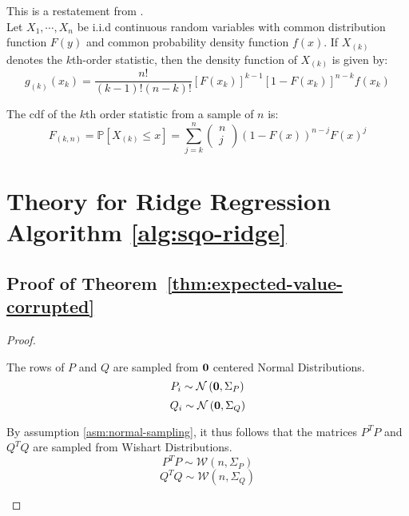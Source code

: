 \documentclass{article} %
\begin{document}
\begin{appendices}
	\begin{fact}
		This is a restatement from \cite{Wackerly2008}.\\
		Let $X_1,\cdots, X_n$ be i.i.d continuous random variables with common distribution function $F(y)$ and common probability density function $f(x)$. If $X_{(k)}$ denotes the $k$th-order statistic, then the density function of $X_{(k)}$ is given by:
		\begin{equation}
			g_{(k)}(x_k) = \frac{n!}{(k-1)!(n-k)!}[F(x_k)]^{k-1}[1 - F(x_k)]^{n-k}f(x_k)
		\end{equation}
	\end{fact}

	\begin{fact}
		The cdf of the $k$th order statistic from a sample of $n$ is:
		\begin{equation}
			F_{(k,n)} = \mathbb{P}\left[X_{(k)}\leq x \right] = \sum_{j=k}^n \begin{pmatrix} n \\ j\end{pmatrix} \left(1 - F(x)\right)^{n-j} F(x)^j
		\end{equation}
	\end{fact}

	\newpage
	
	\section{Theory for Ridge Regression Algorithm \ref{alg:sqo-ridge}}\label{app:Subquantile-optimization}
	\subsection{Proof of Theorem~\ref{thm:expected-value-corrupted}}\label{app:expected-value-corrupted}
	\begin{proof}
	\begin{assumption}\label{asm:normal-sampling}
		The rows of $P$ and $Q$ are sampled from ${\bm{0}}$ centered Normal Distributions.
		\begin{equation*}
			P_i \sim \mathcal{N}\left({\bm{0}}, \Sigma_P\right)
		\end{equation*}
		\begin{equation}
			Q_i \sim \mathcal{N}\left({\bm{0}}, \Sigma_Q\right)
		\end{equation}
	\end{assumption}
	
	\begin{assumption}\label{asm:wishart}
		By assumption \ref{asm:normal-sampling}, it thus follows that the matrices $P^T P$ and $Q^T Q$ are sampled from Wishart Distributions.
		\begin{equation}
			P^T P \sim \mathcal{W}\left(n,\Sigma_P\right)
		\end{equation}
		\begin{equation}
			Q^T Q \sim \mathcal{W}\left(n, \Sigma_Q\right)
		\end{equation}
	\end{assumption}


\end{proof}
\end{appendices}
\end{document}
